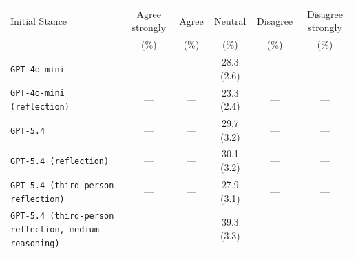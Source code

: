 \begin{tabular}{lccccc}
		\\
		\hline
		Initial Stance & Agree strongly & Agree & Neutral & Disagree & Disagree strongly \\
		 & (\%) & (\%) & (\%) & (\%) & (\%) \\
		\hline
		\texttt{GPT-4o-mini} & --- & --- & 28.3 (2.6) & --- & --- \\
		\texttt{GPT-4o-mini (reflection)} & --- & --- & 23.3 (2.4) & --- & --- \\
		\texttt{GPT-5.4} & --- & --- & 29.7 (3.2) & --- & --- \\
		\texttt{GPT-5.4 (reflection)} & --- & --- & 30.1 (3.2) & --- & --- \\
		\texttt{GPT-5.4 (third-person reflection)} & --- & --- & 27.9 (3.1) & --- & --- \\
		\texttt{GPT-5.4 (third-person reflection, medium reasoning)} & --- & --- & 39.3 (3.3) & --- & --- \\
		\hline
\end{tabular}
